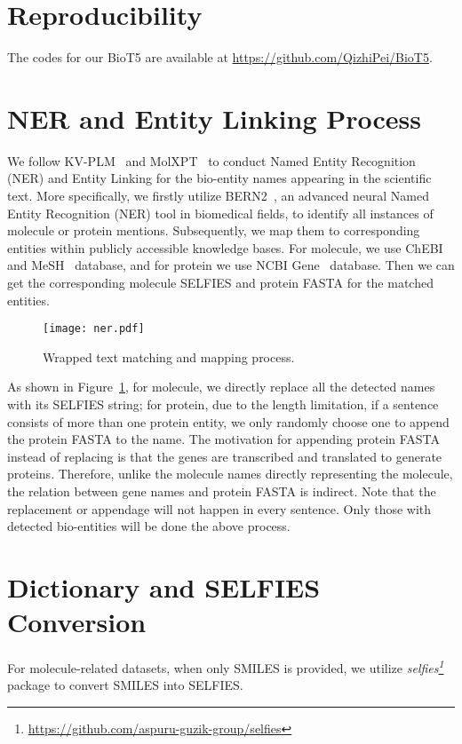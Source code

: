 \documentclass[11pt]{article}
\newcommand{\method}{{BioT5}}
\begin{document}
\clearpage
\appendix

\section{Reproducibility}
The codes for our \method{} are available at \url{https://github.com/QizhiPei/BioT5}. 

\section{NER and Entity Linking Process}
\label{sec:ner_el}
We follow KV-PLM~\citep{zeng2022deep} and MolXPT~\citep{liu2023molxpt} to conduct Named Entity Recognition (NER) and Entity Linking for the bio-entity names appearing in the scientific text.
More specifically, we firstly utilize BERN2~\citep{sung2022bern2}, an advanced neural Named Entity Recognition (NER) tool in biomedical fields, to identify all instances of molecule or protein mentions. 
Subsequently, we map them to corresponding entities within publicly accessible knowledge bases.
For molecule, we use ChEBI~\citep{hastings2016chebi} and MeSH~\citep{lipscomb2000medical} database, and for protein we use NCBI Gene~\citep{brister2015ncbi} database.
Then we can get the corresponding molecule SELFIES and protein FASTA for the matched entities.
\begin{figure}[h]
    \centering
\texttt{[image: ner.pdf]}
    \caption{Wrapped text matching and mapping process.}
    \label{fig:ner}
\end{figure}
As shown in Figure~\ref{fig:ner}, for molecule, we directly replace all the detected names with its SELFIES string;
for protein, due to the length limitation, if a sentence consists of more than one protein entity, we only randomly choose one to append the protein FASTA to the name.
The motivation for appending protein FASTA instead of replacing is that the genes are transcribed and translated to generate proteins. 
Therefore, unlike the molecule names directly representing the molecule, the relation between gene names and protein FASTA is indirect.
Note that the replacement or appendage will not happen in every sentence.
Only those with detected bio-entities will be done the above process.

\section{Dictionary and SELFIES Conversion}
\label{sec:dict_and_conversion}
For molecule-related datasets, when only SMILES is provided, we utilize \textit{selfies\footnote{\url{https://github.com/aspuru-guzik-group/selfies}}} package to convert SMILES into SELFIES.
\end{document}
